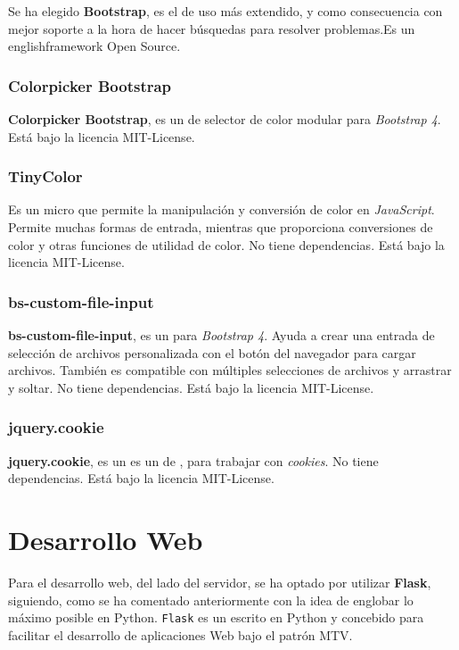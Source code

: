 Se ha elegido \textbf{Bootstrap}, es  el  de uso más extendido, y como consecuencia con mejor soporte a la hora de hacer búsquedas para resolver problemas.Es un english{framework} Open Source.


\subsubsection{Colorpicker Bootstrap}

\textbf{Colorpicker Bootstrap}, es un  de selector de color modular para\emph{ Bootstrap 4}. Está bajo la licencia MIT-License.


\subsubsection{TinyColor}

Es un micro  que permite la manipulación y conversión de color en \emph{JavaScript}. Permite muchas formas de entrada, mientras que proporciona conversiones de color y otras funciones de utilidad de color. No tiene dependencias. Está bajo la licencia MIT-License.


\subsubsection{bs-custom-file-input}

\textbf{bs-custom-file-input}, es un  para \emph{Bootstrap 4}. Ayuda a crear una entrada de selección de archivos personalizada con el botón del navegador para cargar archivos. También es compatible con múltiples selecciones de archivos y arrastrar y soltar.
No tiene dependencias. Está bajo la licencia MIT-License.

\subsubsection{jquery.cookie}

\textbf{jquery.cookie}, es un es un  de  , para trabajar con \emph{cookies}.
No tiene dependencias. Está bajo la licencia MIT-License.



\section{Desarrollo Web}

Para el desarrollo web, del lado del servidor, se ha optado por utilizar \textbf{Flask}, siguiendo, como se ha comentado anteriormente con la idea de englobar lo máximo posible en Python.
\texttt{Flask} es un  escrito en Python y concebido para facilitar el desarrollo de aplicaciones Web bajo el patrón MTV.

